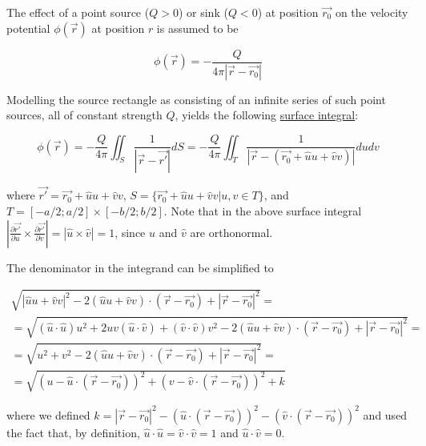 ﻿\documentclass{article}
\begin{document}
The effect of a point source ($Q > 0$) or sink ($Q < 0$) at position $\vec{r_0}$ on the velocity potential $\phi(\vec{r})$ at position $r$ is assumed to be

\begin{equation}
    \label{eq:EffectOfPointSourceOnVelocityPotential}
    \phi(\vec{r}) = - \frac{Q}{4 \pi |\vec{r} - \vec{r_0}|}
\end{equation}

Modelling the source rectangle as consisting of an infinite series of such point sources, all of constant strength $Q$, yields the following \href{https://en.wikipedia.org/wiki/Surface_integral}{surface integral}:

\begin{equation}
    \label{eq:EffectOfARectangularSourcePanelOnVelocityPotential}
    \phi(\vec{r}) = - \frac{Q}{4 \pi} \iint_S \frac{1}{|\vec{r} - \vec{r'}|} dS = - \frac{Q}{4 \pi} \iint_T \frac{1}{|\vec{r} - (\vec{r_0} + \hat{u} u + \hat{v} v)|} du dv
\end{equation}

where $\vec{r'} = \vec{r_0} + \hat{u} u + \hat{v} v$, $S = \{ \vec{r_0} + \hat{u} u + \hat{v} v | u, v \in T \}$, and $T = [- a / 2; a / 2] \times [- b / 2; b / 2]$. Note that in the above surface integral $|\frac{\partial \vec{r'}}{\partial u} \times \frac{\partial \vec{r'}}{\partial v}| = |\hat{u} \times \hat{v}| = 1$, since $\hat{u}$ and $\hat{v}$ are orthonormal.

The denominator in the integrand can be simplified to

\begin{multline*}
    \sqrt{|\hat{u} u + \hat{v} v|^2 - 2 (\hat{u} u + \hat{v} v) \cdot (\vec{r} - \vec{r_0}) + |\vec{r} - \vec{r_0}|^2} = \\
    = \sqrt{(\hat{u} \cdot \hat{u}) u^2 + 2 uv (\hat{u} \cdot \hat{v}) + (\hat{v} \cdot \hat{v}) v^2 - 2 (\hat{u} u + \hat{v} v) \cdot (\vec{r} - \vec{r_0}) + |\vec{r} - \vec{r_0}|^2} = \\
    = \sqrt{u^2 + v^2 - 2 (\hat{u} u + \hat{v} v) \cdot (\vec{r} - \vec{r_0}) + |\vec{r} - \vec{r_0}|^2} = \\
    = \sqrt{(u - \hat{u} \cdot (\vec{r} - \vec{r_0}))^2 + (v - \hat{v} \cdot (\vec{r} - \vec{r_0}))^2 + k}
\end{multline*}

where we defined $k = |\vec{r} - \vec{r_0}|^2 - (\hat{u} \cdot (\vec{r} - \vec{r_0}))^2 - (\hat{v} \cdot (\vec{r} - \vec{r_0}))^2$ and used the fact that, by definition, $\hat{u} \cdot \hat{u} = \hat{v} \cdot \hat{v} = 1$ and $\hat{u} \cdot \hat{v} = 0$.
\end{document}
